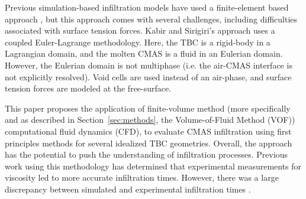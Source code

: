 \documentclass[%
 aip,
 amsmath,amssymb,
 reprint,%
]{revtex4-1}
\begin{document}

Previous simulation-based infiltration models have used a finite-element based approach \cite{Kabir, Sirigiri2018}, but this approach comes with several challenges, including difficulties associated with surface tension forces. Kabir and Sirigiri's approach uses a coupled Euler-Lagrange methodology. Here, the TBC is a rigid-body in a Lagrangian domain, and the molten CMAS is a fluid in an Eulerian domain. However, the Eulerian domain is not multiphase (i.e. the air-CMAS interface is not explicitly resolved). Void cells are used instead of an air-phase, and surface tension forces are modeled at the free-surface.

This paper proposes the application of finite-volume method (more specifically and as described in Section~\ref{sec:methods}, the Volume-of-Fluid Method (VOF)) computational fluid dynamics (CFD), to evaluate CMAS infiltration using first principles methods for several idealized TBC geometries. 
Overall, the approach has the potential to push the understanding of infiltration processes. Previous work using this methodology has determined that experimental measurements for viscosity led to more accurate infiltration times. However, there was a large discrepancy between simulated and experimental infiltration times \cite{Cavainolo2023}. 
\end{document}
